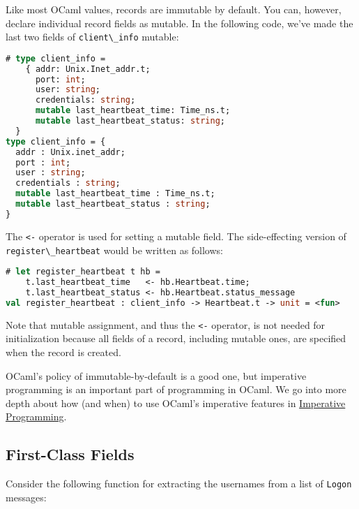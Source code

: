 Like most OCaml values, records are immutable by default. You can,
however, declare individual record fields as mutable. In the following
code, we've made the last two fields of
\passthrough{\lstinline!client\_info!} mutable:

\begin{lstlisting}[language=Caml]
# type client_info =
    { addr: Unix.Inet_addr.t;
      port: int;
      user: string;
      credentials: string;
      mutable last_heartbeat_time: Time_ns.t;
      mutable last_heartbeat_status: string;
  }
type client_info = {
  addr : Unix.inet_addr;
  port : int;
  user : string;
  credentials : string;
  mutable last_heartbeat_time : Time_ns.t;
  mutable last_heartbeat_status : string;
}
\end{lstlisting}

The \passthrough{\lstinline!<-!} operator is used for setting a mutable
field. The side-effecting version of
\passthrough{\lstinline!register\_heartbeat!} would be written as
follows:

\begin{lstlisting}[language=Caml]
# let register_heartbeat t hb =
    t.last_heartbeat_time   <- hb.Heartbeat.time;
    t.last_heartbeat_status <- hb.Heartbeat.status_message
val register_heartbeat : client_info -> Heartbeat.t -> unit = <fun>
\end{lstlisting}

Note that mutable assignment, and thus the \passthrough{\lstinline!<-!}
operator, is not needed for initialization because all fields of a
record, including mutable ones, are specified when the record is
created.

OCaml's policy of immutable-by-default is a good one, but imperative
programming is an important part of programming in OCaml. We go into
more depth about how (and when) to use OCaml's imperative features in
\href{guided-tour.html\#imperative-programming}{Imperative Programming}.

\hypertarget{first-class-fields}{%
\subsection{First-Class Fields}\label{first-class-fields}}

Consider the following function for extracting the usernames from a list
of \passthrough{\lstinline!Logon!}
messages:

